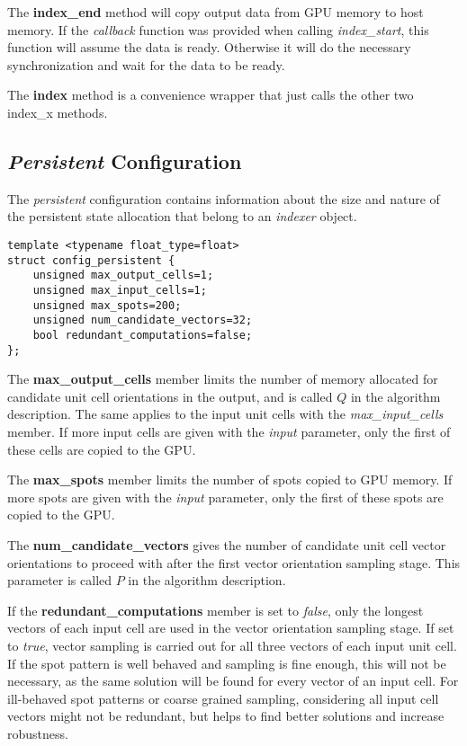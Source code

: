 \documentclass[a4paper,10pt]{article}
\begin{document}
The \textbf{index\_end} method will copy output data from GPU memory to host memory. If the \emph{callback} function was provided when calling \emph{index\_start}, this function will assume the data is ready. Otherwise it will do the necessary synchronization and wait for the data to be ready.

The \textbf{index} method is a convenience wrapper that just calls the other two index\_x methods.

\subsection{\emph{Persistent} Configuration}

The \emph{persistent} configuration contains information about the size and nature of the persistent state allocation that belong to an \emph{indexer} object.
%
\begin{lstlisting}
template <typename float_type=float>
struct config_persistent {
    unsigned max_output_cells=1;
    unsigned max_input_cells=1;
    unsigned max_spots=200;
    unsigned num_candidate_vectors=32;
    bool redundant_computations=false;
};
\end{lstlisting}
%
The \textbf{max\_output\_cells} member limits the number of memory allocated for candidate unit cell orientations in the output, and is called $Q$ in the algorithm description. The same applies to the input unit cells with the \emph{max\_input\_cells} member. If more input cells are given with the \emph{input} parameter, only the first of these cells are copied to the GPU.

The \textbf{max\_spots} member limits the number of spots copied to GPU memory. If more spots are given with the \emph{input} parameter, only the first of these spots are copied to the GPU.

The \textbf{num\_candidate\_vectors} gives the number of candidate unit cell vector orientations to proceed with after the first vector orientation sampling stage. This parameter is called $P$ in the algorithm description.

If the \textbf{redundant\_computations} member is set to \emph{false}, only the longest vectors of each input cell are used in the vector orientation sampling stage. If set to \emph{true}, vector sampling is carried out for all three vectors of each input unit cell. If the spot pattern is well behaved and sampling is fine enough, this will not be necessary, as the same solution will be found for every vector of an input cell. For ill-behaved spot patterns or coarse grained sampling, considering all input cell vectors might not be redundant, but helps to find better solutions and increase robustness.
\end{document}
